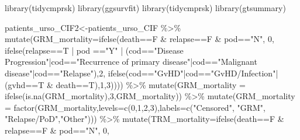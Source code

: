 \documentclass[
]{book}
\newenvironment{Shaded}{\begin{snugshade}}{\end{snugshade}}
\newcommand{\AttributeTok}[1]{\textcolor[rgb]{0.77,0.63,0.00}{#1}}
\newcommand{\DecValTok}[1]{\textcolor[rgb]{0.00,0.00,0.81}{#1}}
\newcommand{\FunctionTok}[1]{\textcolor[rgb]{0.00,0.00,0.00}{#1}}
\newcommand{\NormalTok}[1]{#1}
\newcommand{\OtherTok}[1]{\textcolor[rgb]{0.56,0.35,0.01}{#1}}
\newcommand{\SpecialCharTok}[1]{\textcolor[rgb]{0.00,0.00,0.00}{#1}}
\newcommand{\StringTok}[1]{\textcolor[rgb]{0.31,0.60,0.02}{#1}}
\begin{document}
\begin{Shaded}
\begin{Highlighting}[]
\FunctionTok{library}\NormalTok{(tidycmprsk)}
\FunctionTok{library}\NormalTok{(ggsurvfit)}
\FunctionTok{library}\NormalTok{(tidycmprsk)}
\FunctionTok{library}\NormalTok{(gtsummary)}

\NormalTok{patients\_urso\_CIF2}\OtherTok{\textless{}{-}}\NormalTok{patients\_urso\_CIF }\SpecialCharTok{\%\textgreater{}\%} 
  \FunctionTok{mutate}\NormalTok{(}\AttributeTok{GRM\_mortality=}\FunctionTok{ifelse}\NormalTok{(death}\SpecialCharTok{==}\NormalTok{F }\SpecialCharTok{\&}\NormalTok{ relapse}\SpecialCharTok{==}\NormalTok{F }\SpecialCharTok{\&}\NormalTok{ pod}\SpecialCharTok{==}\StringTok{"N"}\NormalTok{, }\DecValTok{0}\NormalTok{,}
                              \FunctionTok{ifelse}\NormalTok{(relapse}\SpecialCharTok{==}\NormalTok{T }\SpecialCharTok{|}\NormalTok{ pod }\SpecialCharTok{==}\StringTok{"Y"} \SpecialCharTok{|}\NormalTok{ (cod}\SpecialCharTok{==}\StringTok{"Disease Progression"}\SpecialCharTok{|}\NormalTok{cod}\SpecialCharTok{==}\StringTok{"Recurrence of primary disease"}\SpecialCharTok{|}\NormalTok{cod}\SpecialCharTok{==}\StringTok{"Malignant disease"}\SpecialCharTok{|}\NormalTok{cod}\SpecialCharTok{==}\StringTok{"Relapse"}\NormalTok{),}\DecValTok{2}\NormalTok{,                                  }\FunctionTok{ifelse}\NormalTok{(cod}\SpecialCharTok{==}\StringTok{"GvHD"}\SpecialCharTok{|}\NormalTok{cod}\SpecialCharTok{==}\StringTok{"GvHD/Infection"}\SpecialCharTok{|}\NormalTok{(gvhd}\SpecialCharTok{==}\NormalTok{T }\SpecialCharTok{\&}\NormalTok{ death}\SpecialCharTok{==}\NormalTok{T),}\DecValTok{1}\NormalTok{,}\DecValTok{3}\NormalTok{)))) }\SpecialCharTok{\%\textgreater{}\%} 
  \FunctionTok{mutate}\NormalTok{(}\AttributeTok{GRM\_mortality =} \FunctionTok{ifelse}\NormalTok{(}\FunctionTok{is.na}\NormalTok{(GRM\_mortality),}\DecValTok{3}\NormalTok{,GRM\_mortality)) }\SpecialCharTok{\%\textgreater{}\%} 
  \FunctionTok{mutate}\NormalTok{(}\AttributeTok{GRM\_mortality =} \FunctionTok{factor}\NormalTok{(GRM\_mortality,}\AttributeTok{levels=}\FunctionTok{c}\NormalTok{(}\DecValTok{0}\NormalTok{,}\DecValTok{1}\NormalTok{,}\DecValTok{2}\NormalTok{,}\DecValTok{3}\NormalTok{),}\AttributeTok{labels=}\FunctionTok{c}\NormalTok{(}\StringTok{"Censored"}\NormalTok{, }\StringTok{"GRM"}\NormalTok{, }\StringTok{"Relapse/PoD"}\NormalTok{,}\StringTok{"Other"}\NormalTok{))) }\SpecialCharTok{\%\textgreater{}\%} 
  \FunctionTok{mutate}\NormalTok{(}\AttributeTok{TRM\_mortality=}\FunctionTok{ifelse}\NormalTok{(death}\SpecialCharTok{==}\NormalTok{F }\SpecialCharTok{\&}\NormalTok{ relapse}\SpecialCharTok{==}\NormalTok{F }\SpecialCharTok{\&}\NormalTok{ pod}\SpecialCharTok{==}\StringTok{"N"}\NormalTok{, }\DecValTok{0}\NormalTok{,}

\end{Highlighting}
\end{Shaded}
\end{document}
